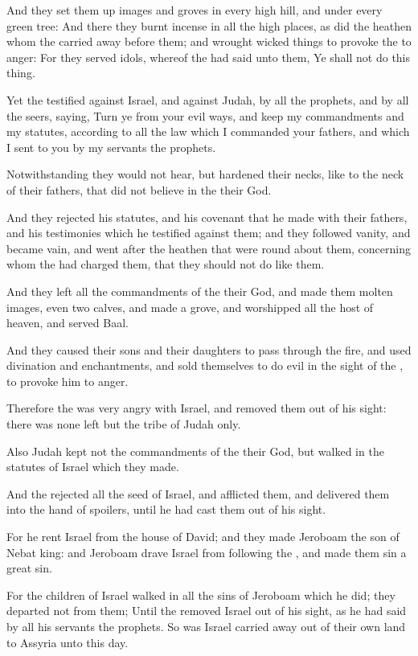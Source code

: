 \Verse And they set them up images and groves in every high hill, and under every green tree: \Verse And there they burnt incense in all the high places, as did the heathen whom the \LORD carried away before them; and wrought wicked things to provoke the \LORD to anger: \Verse For they served idols, whereof the \LORD had said unto them, Ye shall not do this thing.

\Verse Yet the \LORD testified against Israel, and against Judah, by all the prophets, and by all the seers, saying, Turn ye from your evil ways, and keep my commandments and my statutes, according to all the law which I commanded your fathers, and which I sent to you by my servants the prophets.

\Verse Notwithstanding they would not hear, but hardened their necks, like to the neck of their fathers, that did not believe in the \LORD their God.

\Verse And they rejected his statutes, and his covenant that he made with their fathers, and his testimonies which he testified against them; and they followed vanity, and became vain, and went after the heathen that were round about them, concerning whom the \LORD had charged them, that they should not do like them.

\Verse And they left all the commandments of the \LORD their God, and made them molten images, even two calves, and made a grove, and worshipped all the host of heaven, and served Baal.

\Verse And they caused their sons and their daughters to pass through the fire, and used divination and enchantments, and sold themselves to do evil in the sight of the \LORD, to provoke him to anger.

\Verse Therefore the \LORD was very angry with Israel, and removed them out of his sight: there was none left but the tribe of Judah only.

\Verse Also Judah kept not the commandments of the \LORD their God, but walked in the statutes of Israel which they made.

\Verse And the \LORD rejected all the seed of Israel, and afflicted them, and delivered them into the hand of spoilers, until he had cast them out of his sight.

\Verse For he rent Israel from the house of David; and they made Jeroboam the son of Nebat king: and Jeroboam drave Israel from following the \LORD, and made them sin a great sin.

\Verse For the children of Israel walked in all the sins of Jeroboam which he did; they departed not from them; \Verse Until the \LORD removed Israel out of his sight, as he had said by all his servants the prophets. So was Israel carried away out of their own land to Assyria unto this day.

